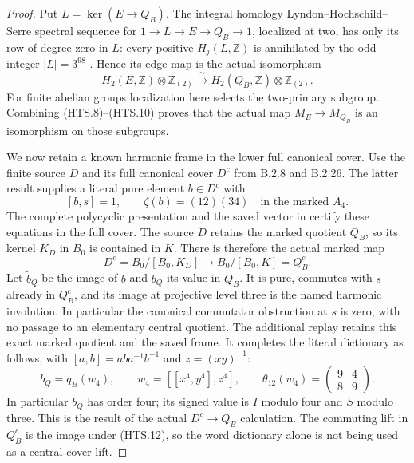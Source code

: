 \begin{proof}
Put $L=\ker(E\to Q_B)$.  The integral homology
Lyndon--Hochschild--Serre spectral sequence
\cite[Theorem~6.8.2, pp.~195--196]{CA_WeibelHA1994} for
$1\to L\to E\to Q_B\to1$, localized at two, has
only its row of degree zero in $L$: every positive
$H_j(L,\mathbb Z)$ is annihilated by the odd integer
$|L|=3^{98}$
\cite[Theorem~6.5.8 and Corollary~6.5.10, p.~180]{CA_WeibelHA1994}.
Hence its edge map is the actual
isomorphism
\[
 H_2(E,\mathbb Z)\otimes\mathbb Z_{(2)}
     \xrightarrow{\ \sim\ }
 H_2(Q_B,\mathbb Z)\otimes\mathbb Z_{(2)}.
 \tag{HTS.10}
\]
For finite abelian groups localization here selects
the two-primary subgroup.  Combining (HTS.8)--(HTS.10)
proves that the actual map $M_E\to M_{Q_B}$ is an
isomorphism on those subgroups.

We now retain a known harmonic frame in the lower
full canonical cover.  Use the finite source $D$ and
its full canonical cover $D^c$ from B.2.8 and B.2.26.
The latter result supplies a literal pure element
$b\in D^c$ with
\[
                    [b,s]=1,\qquad
                    \zeta(b)=(12)(34)
                    \quad\text{in the marked }A_4.
 \tag{HTS.11}
\]
The complete polycyclic presentation and the saved
vector in 
certify these equations in the full cover.  The
source $D$ retains the marked quotient $Q_B$, so its
kernel $K_D$ in $B_0$ is contained in $K$.
There is therefore the actual marked map
\[
 D^c=B_0/[B_0,K_D]\longrightarrow
                   B_0/[B_0,K]=Q_B^c .
 \tag{HTS.12}
\]
Let $\widetilde b_Q$ be the image of $b$ and $b_Q$
its value in $Q_B$.  It is pure, commutes with $s$
already in $Q_B^c$, and its image at projective level
three is the named harmonic involution.  In
particular the canonical commutator obstruction at
$s$ is zero, with no passage to an elementary
central quotient.  The additional replay
 retains
this exact marked quotient and the saved frame.
It completes the literal dictionary as follows, with
$[a,b]=aba^{-1}b^{-1}$ and $z=(xy)^{-1}$:
\[
 b_Q=q_B(w_4),\qquad w_4=[[x^4,y^4],z^4],\qquad
 \theta_{12}(w_4)=
       \begin{pmatrix}9&4\\8&9\end{pmatrix}.
 \tag{HTS.19}
\]
In particular $b_Q$ has order four; its signed value
is $I$ modulo four and $S$ modulo three.  This is
the result of the actual $D^c\to Q_B$ calculation.
The commuting lift in $Q_B^c$ is the image under
(HTS.12), so the word dictionary alone is not being
used as a central-cover lift.


\end{proof}

